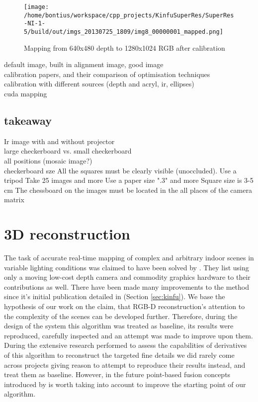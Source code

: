 \documentclass{ucl_thesis}
\newcommand{\secref}[1]{(Section \ref{#1})}
\begin{document}
\begin{figure}[h!]\centering
        \texttt{[image: /home/bontius/workspace/cpp\_projects/KinfuSuperRes/SuperRes-NI-1-5/build/out/imgs\_20130725\_1809/img8\_00000001\_mapped.png]}
        \caption{Mapping from 640x480 depth to 1280x1024 RGB after calibration}
\end{figure}


default image, built in alignment image, good image\\
calibration papers, and their comparison of optimisation techniques\\
calibration with different sources (depth and acryl, ir, ellipses)\\
cuda mapping\\


\subsection{takeaway}
Ir image with and without projector\\
large checkerboard vs. small checkerboard\\
all positions (mosaic image?)\\
checkerboard sze 
All the squares must be clearly visible (unoccluded).
Use a tripod
Take 25 images and more
Use a paper size ".3" and more
Square size is 3-5 cm
The chessboard on the images must be located in the all places of the camera matrix

\section{3D reconstruction}

The task of accurate real-time mapping of complex and
arbitrary indoor scenes in variable lighting conditions was claimed to have been solved by \citep{Newcombe11}. They list using only a
moving low-cost depth camera and commodity graphics hardware to their contributions as well. There have been made many improvements to the method since it's initial publication detailed in \secref{sec:kinfu}. We base the hypothesis of our work on the claim, that RGB-D reconstruction's attention to the complexity of the scenes can be developed further. Therefore, during the design of the system this algorithm was treated as baseline, its results were reproduced, carefully inspected and an attempt was made to improve upon them. During the extensive research performed to assess the capabilities of derivatives of this algorithm to reconstruct the targeted fine details we did rarely come across projects giving reason to attempt to reproduce their results instead, and treat them as baseline. However, in the future point-based fusion concepts introduced by \citep{keller13realtime} is worth taking into account to improve the starting point of our algorithm.
\end{document}
